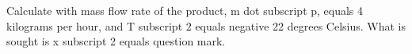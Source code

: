 Calculate with mass flow rate of the product, m dot subscript p, equals 4 kilograms per hour, and T subscript 2 equals negative 22 degrees Celsius. What is sought is x subscript 2 equals question mark.